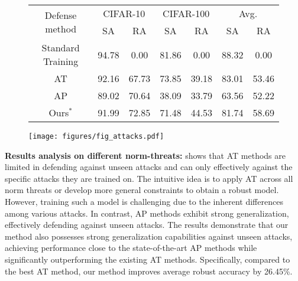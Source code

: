 \begin{figure*}[t]
\vskip -0.1in
  \begin{minipage}[ht]{0.65\linewidth}
  \centering
    \vskip 0.15in
    \label{tab:datasets}
    \begin{tabular}{ccccccc}
    \toprule
    \multirow{2}{*}{Defense method} & \multicolumn{2}{c}{CIFAR-10} & \multicolumn{2}{c}{CIFAR-100} & \multicolumn{2}{c}{Avg.} \\
    \cmidrule(lr){2-3}
    \cmidrule(lr){4-5}
    \cmidrule(lr){6-7}
     & SA & RA & SA & RA & SA & RA\\
    \midrule
    Standard Training & 94.78  & 0.00  & 81.86 & 0.00 & 88.32 & 0.00 \\
    \midrule
    AT \citep{cui2024decoupled} & 92.16  & 67.73 & 73.85 & 39.18 & 83.01 & 53.46 \\
    AP \citep{nie2022diffusion} & 89.02  & 70.64 & 38.09 & 33.79 & 63.56 & 52.22\\
    Ours$^*$  & 91.99 & 72.85 & 71.48 & 44.53 & 81.74 & 58.69 \\
    \bottomrule
    \bottomrule
    \end{tabular}
    \vskip -0.1in
  \end{minipage}\quad\quad
  \begin{minipage}[ht]{0.3\linewidth}
  \vskip 0.2in
    \centering
    \texttt{[image: figures/fig\_attacks.pdf]}
    \label{fig:attacks}
    \vskip -0.2in
  \end{minipage}
  \vskip -0.1in
\end{figure*}

\textbf{Results analysis on different norm-threats:}
 shows that AT methods \citep{laidlaw2021perceptual,dolatabadi2022} are limited in defending against unseen attacks and can only effectively against the specific attacks they are trained on. The intuitive idea is to apply AT across all norm threats or develop more general constraints to obtain a robust model. However, training such a model is challenging due to the inherent differences among various attacks. In contrast, AP methods \citep{nie2022diffusion,lin2024adversarial} exhibit strong generalization, effectively defending against unseen attacks. The results demonstrate that our method also possesses strong generalization capabilities against unseen attacks, achieving performance close to the state-of-the-art AP methods while significantly outperforming the existing AT methods. Specifically, compared to the best AT method, our method improves average robust accuracy by 26.45\%.



